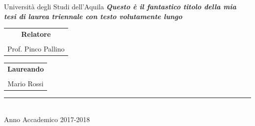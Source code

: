 \begin{center}
    {\LARGE Università degli Studi dell'Aquila}
    \vspace{.7cm}
    \vspace{2cm}
    \large{{\textbf{\emph{
                Questo è il fantastico titolo della mia tesi di laurea triennale con testo
                volutamente lungo
            }}}
    }
    
    \vspace{3.5cm}

    \begin{tabular}{c}
        \normalsize\textbf{Relatore}\\\\
        \normalsize{Prof. Pinco Pallino}
    \end{tabular}
    \hfill
    \begin{tabular}{c}
        \normalsize\textbf{Laureando}\\\\
        \normalsize{Mario Rossi}
    \end{tabular}

    \vspace{4.5cm}

    \rule{10cm}{.1mm}\\ {\large Anno Accademico 2017-2018}

\end{center}